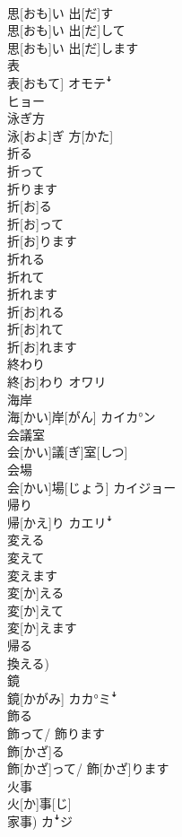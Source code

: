 \documentclass[8pt]{extreport}
\begin{document}
\begin{CJK}{UTF8}{min}
\\	思[おも]い 出[だ]す 
\\	思[おも]い 出[だ]して 
\\	思[おも]い 出[だ]します	
\\	表	
\\	表[おもて]	オモテꜜ 
\\	ヒョー
\\	泳ぎ方	
\\	泳[およ]ぎ 方[かた]	
\\	折る 
\\	折って 
\\	折ります	
\\	折[お]る 
\\	折[お]って 
\\	折[お]ります	
\\	折れる 
\\	折れて 
\\	折れます	
\\	折[お]れる 
\\	折[お]れて 
\\	折[お]れます	
\\	終わり	
\\	終[お]わり	オワリ
\\	海岸	
\\	海[かい]岸[がん]	カイカ°ン
\\	会議室	
\\	会[かい]議[ぎ]室[しつ]	
\\	会場	
\\	会[かい]場[じょう]	カイジョー
\\	帰り	
\\	帰[かえ]り	カエリꜜ
\\	変える 
\\	変えて 
\\	変えます	
\\	変[か]える 
\\	変[か]えて 
\\	変[か]えます 
\\	帰る 
\\	換える)	
\\	鏡	
\\	鏡[かがみ]	カカ°ミꜜ
\\	飾る 
\\	飾って/ 飾ります	
\\	飾[かざ]る 
\\	飾[かざ]って/ 飾[かざ]ります	
\\	火事	
\\	火[か]事[じ] 
\\	家事)	カꜜジ

\end{CJK}
\end{document}
